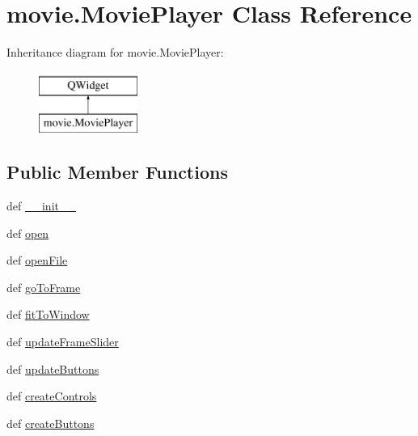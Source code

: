 \hypertarget{classmovie_1_1MoviePlayer}{}\section{movie.\+Movie\+Player Class Reference}
\label{classmovie_1_1MoviePlayer}
Inheritance diagram for movie.\+Movie\+Player\+:\begin{figure}[H]
\begin{center}
\leavevmode
\includegraphics[height=2.000000cm]{classmovie_1_1MoviePlayer}
\end{center}
\end{figure}
\subsection*{Public Member Functions}
\begin{DoxyCompactItemize}
\item 
def \hyperlink{classmovie_1_1MoviePlayer_a00fd22cb74b7001c67a85ef8f36681cd}{\+\_\+\+\_\+init\+\_\+\+\_\+}
\item 
def \hyperlink{classmovie_1_1MoviePlayer_a1186495da308493f4cbc919f3a4f3170}{open}
\item 
def \hyperlink{classmovie_1_1MoviePlayer_aa9d214cfac6bdd5d241e845f5881ad53}{open\+File}
\item 
def \hyperlink{classmovie_1_1MoviePlayer_a7a6ee40d066639209625b1f476b744eb}{go\+To\+Frame}
\item 
def \hyperlink{classmovie_1_1MoviePlayer_a5ca2d6966e15dc93ec890fdd06487de4}{fit\+To\+Window}
\item 
def \hyperlink{classmovie_1_1MoviePlayer_aa3ad61a34001c1325279825396ad9d8d}{update\+Frame\+Slider}
\item 
def \hyperlink{classmovie_1_1MoviePlayer_a174074d274cb50a11cf722db4dc9c395}{update\+Buttons}
\item 
def \hyperlink{classmovie_1_1MoviePlayer_a5adcb318c8cb3705bffe593b0c9e1fcc}{create\+Controls}
\item 
def \hyperlink{classmovie_1_1MoviePlayer_acac5f1e8bb5d750636f39bf033f48ca1}{create\+Buttons}
\end{DoxyCompactItemize}
